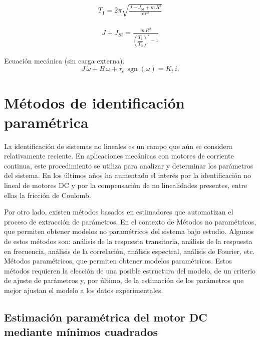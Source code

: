         \begin{align}
        T_1 = 2\pi \sqrt{\frac{J + J_{St} + m\,R^2}{c\,r^2}}
        \end{align}
        
        \begin{align}
        J + J_{St} = \frac{m\,R^2}{\left(\dfrac{T_1}{T_0}\right)^2 - 1}
        \end{align}

        Ecuación mecánica (sin carga externa).
        \[
        J\,\dot\omega + B\,\omega + \tau_c\,\operatorname{sgn}(\omega) = K_t\,i.
        \]
        \label{eq:rotor}
        
\section{Métodos de identificación paramétrica}
    La identificación de sistemas no lineales es un campo que aún se considera relativamente reciente. En aplicaciones mecánicas con motores de corriente continua, este procedimiento se utiliza para analizar y determinar los parámetros del sistema. En los últimos años ha aumentado el interés por la identificación no lineal de motores \ac{DC} y por la compensación de no linealidades presentes, entre ellas la fricción de Coulomb.

    Por otro lado, existen métodos basados en estimadores que automatizan el proceso de extracción de parámetros. En el contexto de 
    Métodos no paramétricos, que permiten obtener modelos no paramétricos del sistema bajo estudio. Algunos de estos métodos son: análisis de la respuesta transitoria, análisis de la respuesta en frecuencia, análisis de la correlación, análisis espectral, análisis de Fourier, etc.
    Métodos paramétricos, que permiten obtener modelos paramétricos. Estos métodos requieren la elección de una posible estructura del modelo, de un criterio de ajuste de parámetros y, por último, de la estimación de los parámetros que mejor ajustan el modelo a los datos experimentales.

    \subsection{Estimación paramétrica del motor \ac{DC} mediante mínimos cuadrados}

